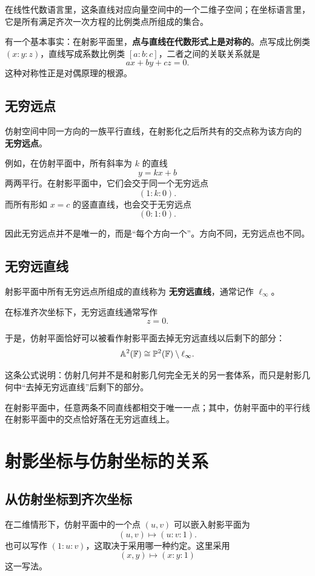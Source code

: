 在线性代数语言里，这条直线对应向量空间中的一个二维子空间；在坐标语言里，它是所有满足齐次一次方程的比例类点所组成的集合。

有一个基本事实：在射影平面里，\textbf{点与直线在代数形式上是对称的}。点写成比例类 $(x:y:z)$，直线写成系数比例类 $[a:b:c]$，二者之间的关联关系就是
\[
ax+by+cz=0.
\]
这种对称性正是对偶原理的根源。

\subsection{无穷远点}
\begin{definition}
仿射空间中同一方向的一族平行直线，在射影化之后所共有的交点称为该方向的 \textbf{无穷远点}。
\end{definition}

例如，在仿射平面中，所有斜率为 $k$ 的直线
\[
y=kx+b
\]
两两平行。在射影平面中，它们会交于同一个无穷远点
\[
(1:k:0).
\]
而所有形如 $x=c$ 的竖直直线，也会交于无穷远点
\[
(0:1:0).
\]

因此无穷远点并不是唯一的，而是“每个方向一个”。方向不同，无穷远点也不同。

\subsection{无穷远直线}
\begin{definition}
射影平面中所有无穷远点所组成的直线称为 \textbf{无穷远直线}，通常记作 $\ell_\infty$。
\end{definition}

在标准齐次坐标下，无穷远直线通常写作
\[
z=0.
\]

于是，仿射平面恰好可以被看作射影平面去掉无穷远直线以后剩下的部分：
\[
\mathbb{A}^2(\mathbb{F})\cong \mathbb{P}^2(\mathbb{F})\setminus \ell_\infty.
\]

这条公式说明：仿射几何并不是和射影几何完全无关的另一套体系，而只是射影几何中“去掉无穷远直线”后剩下的部分。

\begin{property}
在射影平面中，任意两条不同直线都相交于唯一一点；其中，仿射平面中的平行线在射影平面中的交点恰好落在无穷远直线上。
\end{property}

\section{射影坐标与仿射坐标的关系}

\subsection{从仿射坐标到齐次坐标}
在二维情形下，仿射平面中的一个点 $(u,v)$ 可以嵌入射影平面为
\[
(u,v)\longmapsto (u:v:1).
\]
也可以写作 $(1:u:v)$，这取决于采用哪一种约定。这里采用
\[
(x,y)\mapsto (x:y:1)
\]
这一写法。


